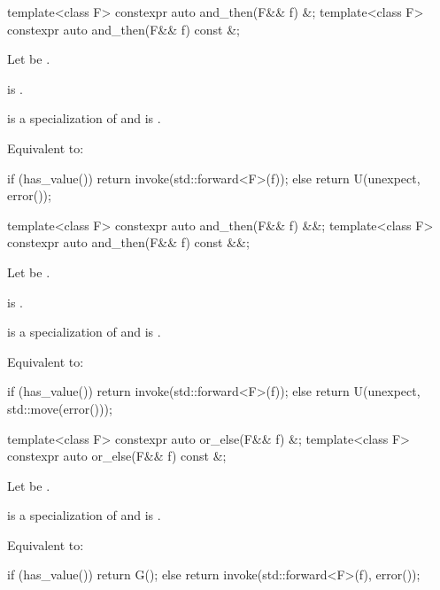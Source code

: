 %
\begin{itemdecl}
template<class F> constexpr auto and_then(F&& f) &;
template<class F> constexpr auto and_then(F&& f) const &;
\end{itemdecl}

\begin{itemdescr}
\pnum
Let  be .

\pnum
\constraints
{} is .

\pnum
\mandates
{} is a specialization of  and
 is .

\pnum
\effects
Equivalent to:
\begin{codeblock}
if (has_value())
  return invoke(std::forward<F>(f));
else
  return U(unexpect, error());
\end{codeblock}
\end{itemdescr}

%
\begin{itemdecl}
template<class F> constexpr auto and_then(F&& f) &&;
template<class F> constexpr auto and_then(F&& f) const &&;
\end{itemdecl}

\begin{itemdescr}
\pnum
Let  be .

\pnum
\constraints
{} is .

\pnum
\mandates
{} is a specialization of  and
 is .

\pnum
\effects
Equivalent to:
\begin{codeblock}
if (has_value())
  return invoke(std::forward<F>(f));
else
  return U(unexpect, std::move(error()));
\end{codeblock}
\end{itemdescr}

%
\begin{itemdecl}
template<class F> constexpr auto or_else(F&& f) &;
template<class F> constexpr auto or_else(F&& f) const &;
\end{itemdecl}

\begin{itemdescr}
\pnum
Let  be .

\pnum
\mandates
{} is a specialization of  and
 is .

\pnum
\effects
Equivalent to:
\begin{codeblock}
if (has_value())
  return G();
else
  return invoke(std::forward<F>(f), error());
\end{codeblock}
\end{itemdescr}

